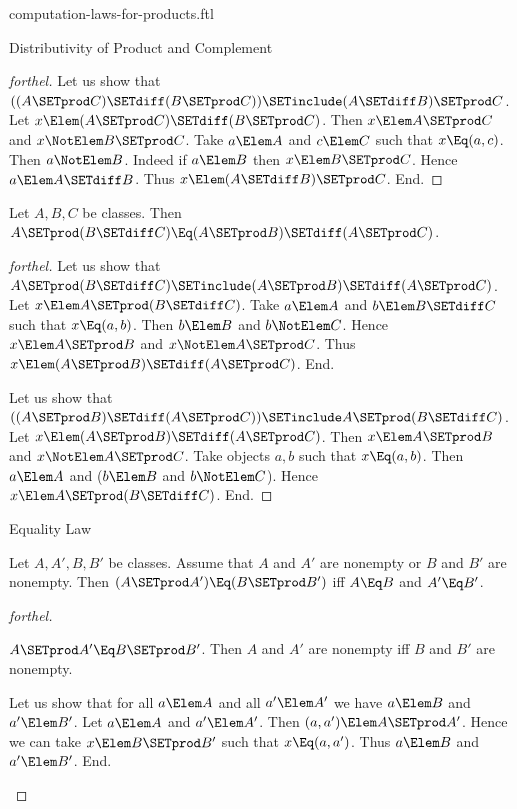 \documentclass{stex}
\begin{document}
\begin{smodule}{computation-laws-for-products.ftl}
\begin{sfragment}{Distributivity of Product and Complement}
\begin{proof}[forthel]
    Let us show that $((A \SETprod C) \SETdiff (B \SETprod C)) \SETinclude (A \SETdiff B) \SETprod C$. %
      Let $x \Elem (A \SETprod C) \SETdiff (B \SETprod C)$.
      Then $x \Elem A \SETprod C$ and $x \NotElem B \SETprod C$.
      Take $a \Elem A$ and $c \Elem C$ such that $x \Eq (a, c)$.
      Then $a \NotElem B$.
      Indeed if $a \Elem B$ then $x \Elem B \SETprod C$.
      Hence $a \Elem A \SETdiff B$.
      Thus $x \Elem (A \SETdiff B) \SETprod C$.
    End.
  \end{proof}

  \begin{proposition}[forthel,id=FOUNDATIONS_05_3195639422779392]
    Let $A, B, C$ be classes.
    Then $A \SETprod (B \SETdiff C) \Eq (A \SETprod B) \SETdiff (A \SETprod C)$.
  \end{proposition}
  \begin{proof}[forthel]
    Let us show that $A \SETprod (B \SETdiff C) \SETinclude (A \SETprod B) \SETdiff (A \SETprod C)$.
      Let $x \Elem A \SETprod (B \SETdiff C)$.
      Take $a \Elem A$ and $b \Elem B \SETdiff C$ such that $x \Eq (a, b)$.
      Then $b \Elem B$ and $b \NotElem C$.
      Hence $x \Elem A \SETprod B$ and $x \NotElem A \SETprod C$.
      Thus $x \Elem (A \SETprod B) \SETdiff (A \SETprod C)$.
    End.

    Let us show that $((A \SETprod B) \SETdiff (A \SETprod C)) \SETinclude A \SETprod (B \SETdiff C)$. %
      Let $x \Elem (A \SETprod B) \SETdiff (A \SETprod C)$.
      Then $x \Elem A \SETprod B$ and $x \NotElem A \SETprod C$.
      Take objects $a, b$ such that $x \Eq (a, b)$.
      Then $a \Elem A$ and ($b \Elem B$ and $b \NotElem C$).
      Hence $x \Elem A \SETprod (B \SETdiff C)$.
    End.
  \end{proof}
\end{sfragment}

\begin{sfragment}{Equality Law}
  \begin{proposition}[forthel,id=FOUNDATIONS_05_2677218429894656]
    Let $A, A', B, B'$ be classes.
    Assume that $A$ and $A'$ are nonempty or $B$ and $B'$ are nonempty.
    Then $(A \SETprod A') \Eq (B \SETprod B')$ iff $A \Eq B$ and $A' \Eq B'$.
  \end{proposition}
  \begin{proof}[forthel]
    \begin{case}{$A \SETprod A' \Eq B \SETprod B'$.}
      Then $A$ and $A'$ are nonempty iff $B$ and $B'$ are nonempty.

      Let us show that for all $a \Elem A$ and all $a' \Elem A'$ we have $a \Elem B$ and $a' \Elem B'$.
        Let $a \Elem A$ and $a' \Elem A'$.
        Then $(a, a') \Elem A \SETprod A'$.
        Hence we can take $x \Elem B \SETprod B'$ such that $x \Eq (a, a')$.
        Thus $a \Elem B$ and $a' \Elem B'$.
      End.


\end{case}
\end{proof}
\end{sfragment}
\end{smodule}
\end{document}
